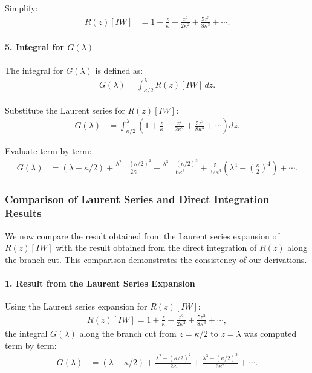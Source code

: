 Simplify:
\begin{align}
R(z)[IW] &= 1 + \frac{z}{\kappa} + \frac{z^2}{2\kappa^2} + \frac{5z^3}{8\kappa^3} + \cdots.
\end{align}

\paragraph{5. Integral for $G(\lambda)$}

The integral for $G(\lambda)$ is defined as:
\begin{align}
G(\lambda) = \int_{\kappa/2}^\lambda R(z)[IW] \, dz.
\end{align}

Substitute the Laurent series for $R(z)[IW]$:
\begin{align}
G(\lambda) &= \int_{\kappa/2}^\lambda \left(1 + \frac{z}{\kappa} + \frac{z^2}{2\kappa^2} + \frac{5z^3}{8\kappa^3} + \cdots\right) dz.
\end{align}

Evaluate term by term:
\begin{align}
G(\lambda) &= (\lambda - \kappa/2) + \frac{\lambda^2 - (\kappa/2)^2}{2\kappa} + \frac{\lambda^3 - (\kappa/2)^3}{6\kappa^2} + \frac{5}{32\kappa^3} \left(\lambda^4 - \left(\frac{\kappa}{2}\right)^4\right) + \cdots.
\end{align}


\subsubsection{ Comparison of Laurent Series and Direct Integration Results}

We now compare the result obtained from the Laurent series expansion of $R(z)[IW]$ with the result obtained from the direct integration of $R(z)$ along the branch cut. This comparison demonstrates the consistency of our derivations.

\paragraph{1. Result from the Laurent Series Expansion}

Using the Laurent series expansion for $R(z)[IW]$:
\begin{align}
R(z)[IW] = 1 + \frac{z}{\kappa} + \frac{z^2}{2\kappa^2} + \frac{5z^3}{8\kappa^3} + \cdots,
\end{align}
the integral $G(\lambda)$ along the branch cut from $z = \kappa/2$ to $z = \lambda$ was computed term by term:
\begin{align}
G(\lambda) &= (\lambda - \kappa/2) + \frac{\lambda^2 - (\kappa/2)^2}{2\kappa} + \frac{\lambda^3 - (\kappa/2)^3}{6\kappa^2} + \cdots.
\end{align}

